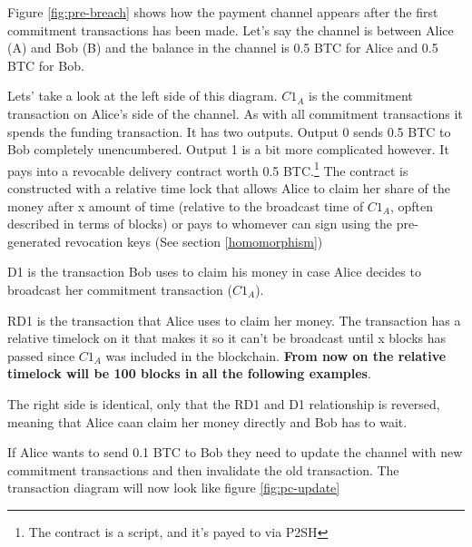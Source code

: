 Figure \ref{fig:pre-breach} shows how the payment channel appears after the first commitment transactions has been made. Let's say the channel is between Alice (A) and Bob (B) and the balance in the channel is 0.5 BTC for Alice and 0.5 BTC for Bob. 

Lets' take a look at the left side of this diagram. \textbf{$C1_{A}$} is the commitment transaction on Alice's side of the channel. As with all commitment transactions it spends the funding transaction. It has two outputs. Output 0 sends 0.5 BTC to Bob completely unencumbered. Output 1 is a bit more complicated however. It pays into a revocable delivery contract worth 0.5 BTC.\footnote{The contract is a script, and it's payed to via P2SH} The contract is constructed with a relative time lock that allows Alice to claim her share of the money after x amount of time (relative to the broadcast time of $C1_{A}$, opften described in terms of blocks) or pays to whomever can sign using the pre-generated revocation keys (See section \ref{homomorphism})

D1 is the transaction Bob uses to claim his money in case Alice decides to broadcast her commitment transaction ($C1_{A}$).

RD1 is the transaction that Alice uses to claim her money. The transaction has a relative timelock on it that makes it so it can't be broadcast until x blocks has passed since $C1_{A}$ was included in the blockchain. \textbf{From now on the relative timelock will be 100 blocks in all the following examples}.

The right side is identical, only that the RD1 and D1 relationship is reversed, meaning that Alice caan claim her money directly and Bob has to wait. 

If Alice wants to send 0.1 BTC to Bob they need to update the channel with new commitment transactions and then invalidate the old transaction. The transaction diagram will now look like figure \ref{fig:pc-update}

